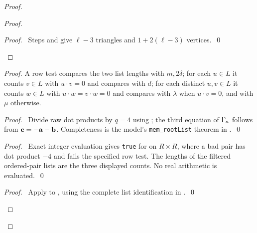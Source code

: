 \begin{proof}
\begin{proof}
  \qedstep
  \begin{proof}\pf\ Steps  and  give
   $\ell-3$ triangles and $1+2(\ell-3)$ vertices.~\qed\end{proof}
 \end{proof}
 \begin{proof}
  A row test compares the two list lengths with $m,2\delta$; for each $u\in L$
  it counts $v\in L$ with $u\cdot v=0$ and compares with $d$; for each distinct
  $u,v\in L$ it counts $w\in L$ with $u\cdot w=v\cdot w=0$ and compares with
  $\lambda$ when $u\cdot v=0$, and with $\mu$ otherwise.
  \begin{proof}\pf\ Divide raw dot products by $q=4$ using
   ; the third equation of $\Gamma_a$ follows
   from ${\mathbf c}=-{\mathbf a}-{\mathbf b}$. Completeness is the model's
   \texttt{mem\_rootList} theorem in .~\qed\end{proof}
  \begin{proof}\pf\ Exact integer evaluation gives \texttt{true} for
    on $R\times R$, where a bad pair has dot
   product $-4$ and fails the specified row test. The lengths of the filtered
   ordered-pair lists are the three displayed counts. No real arithmetic is evaluated.~\qed\end{proof}
  \begin{proof}\pf\ Apply  to
   , using the complete list identification in
   .~\qed\end{proof}

\end{proof}
\end{proof}
